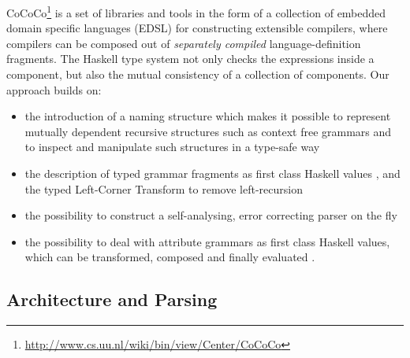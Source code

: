 CoCoCo\footnote{\url{http://www.cs.uu.nl/wiki/bin/view/Center/CoCoCo}} is a set of libraries and tools in the form of a collection of embedded domain specific languages (EDSL) for constructing extensible compilers,
where compilers can be composed out of \emph{separately compiled}  
language-definition fragments. The Haskell type system  not only checks the expressions inside a component, but also the mutual consistency of a collection of components. Our approach builds on:
\begin{itemize}
\item the introduction of a naming structure which makes it possible to represent mutually dependent 
recursive structures such as context free grammars and to inspect and manipulate such structures in a type-safe way \cite{BSV09}
\item the description of typed grammar fragments as first class Haskell values \cite{VSD12}, and the typed Left-Corner Transform to remove left-recursion \cite{BSV09b}
\item the possibility to construct a self-analysing, error correcting parser on the fly \cite{Swie2000,Swierstra08}
\item the possibility to deal with attribute grammars as first class  Haskell values, which can be transformed, composed and finally evaluated \cite{Viera:Attribute-Grammars,UU-CS-2011-028,VSM12}.
\end{itemize}

 

\subsection{Architecture and Parsing}

